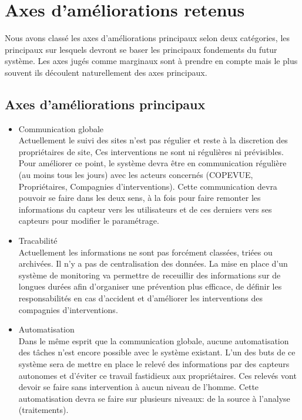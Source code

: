 \section{Axes d'améliorations retenus}

Nous avons classé les axes d'améliorations principaux selon deux catégories, les principaux sur lesquels devront se baser les principaux fondements du futur système. Les axes jugés comme marginaux sont à prendre en compte mais le plus souvent ils découlent naturellement des axes principaux. 

\subsection{Axes d'améliorations principaux}

\begin{itemize}

	\item Communication globale \\

	Actuellement le suivi des sites n'est pas régulier et reste à la discretion des propriétaires de site, Ces interventions ne sont ni régulières ni prévisibles. Pour améliorer ce point, le système devra être en communication régulière (au moins tous les jours) avec les acteurs concernés (COPEVUE, Propriétaires, Compagnies d'interventions). Cette communication devra pouvoir se faire dans les deux sens, à la fois pour faire remonter les informations du capteur vers les utilisateurs et de ces derniers vers ses capteurs pour modifier le paramétrage. 

	\item Tracabilité \\

	Actuellement les informations ne sont pas forcément classées, triées ou archivées. Il n'y a pas de centralisation des données. La mise en place d'un système de monitoring va permettre de receuillir des informations sur de longues durées afin d'organiser une prévention plus efficace, de définir les responsabilités en cas d'accident et d'améliorer les interventions des compagnies d'interventions.

	\item Automatisation \\
	
	Dans le même esprit que la communication globale, aucune automatisation des tâches n'est encore possible avec le système existant. L'un des buts de ce système sera de mettre en place le relevé des informations par des capteurs autonomes et d'éviter ce travail fastidieux aux propriétaires. Ces relevés vont devoir se faire sans intervention à aucun niveau de l'homme. Cette automatisation devra se faire sur plusieurs niveaux: de la source à l'analyse (traitements). 
	

\end{itemize}
